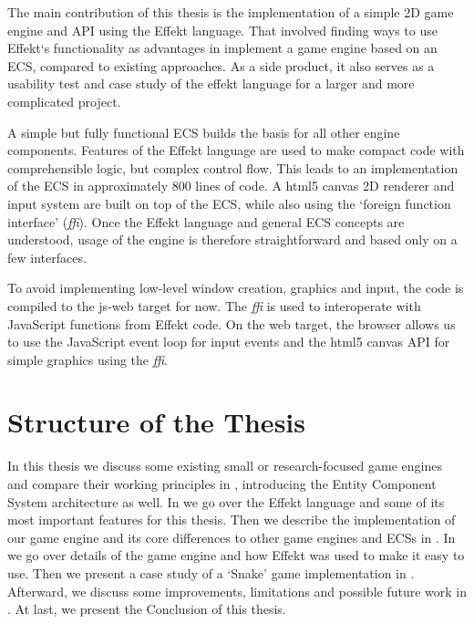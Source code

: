 The main contribution of this thesis is the implementation of a simple 2D game engine and API using the Effekt language. That involved finding ways to use Effekt`s functionality as advantages in implement a game engine based on an ECS, compared to existing approaches. As a side product, it also serves as a usability test and case study of the effekt language for a larger and more complicated project.

A simple but fully functional ECS builds the basis for all other engine components. Features of the Effekt language are used to make compact code with comprehensible logic, but complex control flow. This leads to an implementation of the ECS in approximately 800 lines of code. A html5 \textsf{canvas} 2D renderer and input system are built on top of the ECS, while also using the `foreign function interface' (\textit{ffi}). Once the Effekt language and general ECS concepts are understood, usage of the engine is therefore straightforward and based only on a few interfaces.

To avoid implementing low-level window creation, graphics and input, the code is compiled to the \textsf{js-web} target for now. The \textit{ffi} is used to interoperate with JavaScript functions from Effekt code. On the web target, the browser allows us to use the JavaScript event loop for input events and the html5 \textsf{canvas} API for simple graphics using the \textit{ffi}.

\section*{Structure of the Thesis}

In this thesis we discuss some existing small or research-focused game engines and compare their working principles in , introducing the Entity Component System architecture as well. In  we go over the Effekt language and some of its most important features for this thesis. Then we describe the implementation of our game engine and its core differences to other game engines and ECSs in . In  we go over details of the game engine and how Effekt was used to make it easy to use. Then we present a case study of a `Snake' game implementation in . Afterward, we discuss some improvements, limitations and possible future work in . At last, we present the Conclusion of this thesis.
